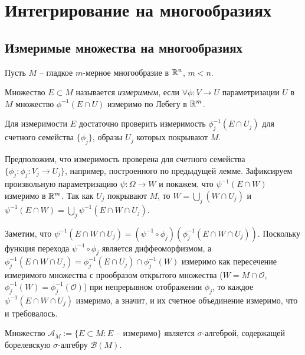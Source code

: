 \section{Интегрирование на многообразиях}

\subsection{Измеримые множества на многообразиях}

Пусть $M$ -- гладкое $m$-мерное многообразие в $\mathbb{R}^n$, $m < n$.

\begin{definition}
	Множество $E \subset M$ называется \textit{измеримым}, если $\forall \phi : V \to U$ параметризации $U$ в $M$ множество $\phi^{-1}(E \cap U)$ измеримо по Лебегу в $\mathbb{R}^m$.
\end{definition}

\begin{note}
	Для измеримости $E$ достаточно проверить измеримость $\phi^{-1}_j (E \cap U_j)$ для счетного семейства $\{\phi_j\}$, образы $U_j$ которых покрывают $M$.
\end{note}

\begin{myproof}
	Предположим, что измеримость проверена для счетного семейства $\{\phi_j : \phi_j : V_j \to U_j\}$, например, построенного по предыдущей лемме. 
	Зафиксируем произвольную параметризацию $\psi : \Omega \to W$ и покажем, что $\psi^{-1}(E \cap W)$ измеримо в $\mathbb{R}^m$. 
	Так как $U_j$ покрывают $M$, то $W = \bigcup_{j} (W \cap U_j)$ и $\psi^{-1}(E \cap W) = \bigcup_{j} \psi^{-1}(E \cap W \cap U_j)$.
	
	\vspace{5pt}
	Заметим, что $\psi^{-1} (E \cap W \cap U_j) = (\psi^{-1} \circ \phi_j) (\phi^{-1}_j (E \cap W \cap U_j))$. 
	Поскольку функция перехода $\psi^{-1} \circ \phi_j$ является диффеоморфизмом, а $\phi_j^{-1}(E \cap W \cap U_j) = \phi_j^{-1}(E \cap U_j) \cap \phi^{-1}_j(W)$ измеримо как пересечение измеримого множества с прообразом открытого множества ($W = M \cap \mathcal{O}$, $\phi_j^{-1}(W) = \phi_j^{-1}(\mathcal{O})$) при непрерывном отображении $\phi_j$, 
	то каждое $\psi^{-1}(E \cap W \cap U_j)$ измеримо, а значит, и их счетное объединение измеримо, что и требовалось.
\end{myproof}

\begin{lemma}
	Множество $\mathcal{A}_M := \{E \subset M : E \text{ -- измеримо}\}$ является $\sigma$-алгеброй, содержащей борелевскую $\sigma$-алгебру $\mathcal{B}(M)$.
\end{lemma}


